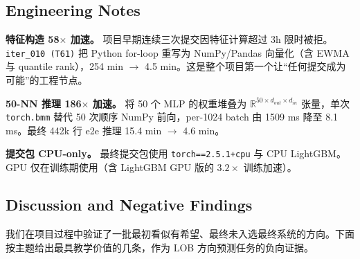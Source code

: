 \documentclass[11pt]{article}
\begin{document}
\subsection{Engineering Notes}
\label{sec:eng}

\noindent\textbf{特征构造 58$\times$ 加速。}
项目早期连续三次提交因特征计算超过 3h 限时被拒。\texttt{iter\_010 (T61)} 把 Python for-loop 重写为 NumPy/Pandas 向量化（含 EWMA 与 quantile rank），254 min $\to$ 4.5 min。这是整个项目第一个让``任何提交成为可能''的工程节点。

\noindent\textbf{50-NN 推理 186$\times$ 加速。}
将 50 个 MLP 的权重堆叠为 $\mathbb{R}^{50\times d_{out}\times d_{in}}$ 张量，单次 \texttt{torch.bmm} 替代 50 次顺序 NumPy 前向，per-1024 batch 由 1509 ms 降至 8.1 ms。最终 442k 行 e2e 推理 15.4 min $\to$ 4.6 min。

\noindent\textbf{提交包 CPU-only。}
最终提交包使用 \texttt{torch==2.5.1+cpu} 与 CPU LightGBM。GPU 仅在训练期使用（含 LightGBM GPU 版的 $3.2\times$ 训练加速）。

\subsection{Discussion and Negative Findings}
\label{sec:negative}

我们在项目过程中验证了一批最初看似有希望、最终未入选最终系统的方向。下面按主题给出最具教学价值的几条，作为 LOB 方向预测任务的负向证据。
\end{document}
